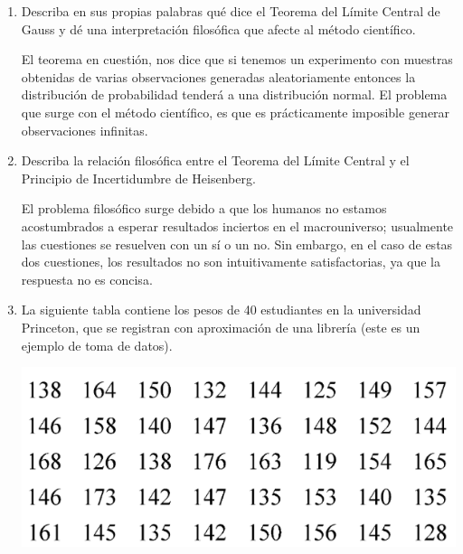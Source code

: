 \begin{enumerate}
	\item Describa en sus propias palabras qué dice el Teorema del Límite Central de Gauss y dé una interpretación filosófica que afecte al método científico.
	\begin{sol}
		El teorema en cuestión, nos dice que si tenemos un experimento con muestras obtenidas de varias observaciones generadas aleatoriamente entonces la distribución de probabilidad tenderá a una distribución normal. El problema que surge con el método científico, es que es prácticamente imposible generar observaciones infinitas. 
	\end{sol}
	
	\item Describa la relación filosófica entre el Teorema del Límite Central y el Principio de Incertidumbre de Heisenberg. 
	\begin{sol}
		El problema filosófico surge debido a que los humanos no estamos acostumbrados a esperar resultados inciertos en el macrouniverso; usualmente las cuestiones se resuelven con un sí o un no. Sin embargo, en el caso de estas dos cuestiones, los resultados no son intuitivamente satisfactorias, ya que la respuesta no es concisa. 
	\end{sol}
	\item La siguiente tabla contiene los pesos de 40 estudiantes en la universidad Princeton, que se registran con aproximación de una librería (este es un ejemplo de toma de datos).
	\begin{center}
		\includegraphics[scale=0.4]{images/1}
	\end{center}


\end{enumerate}
